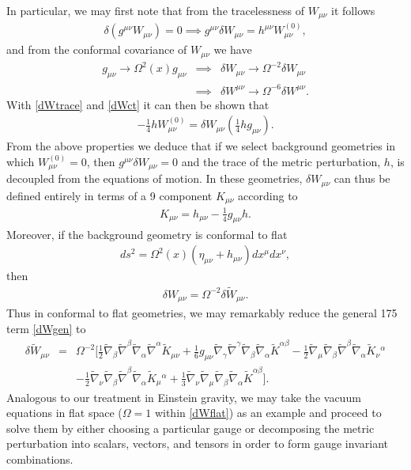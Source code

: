 \documentclass[10pt,letterpaper]{article}
\numberwithin{equation}{section}
\begin{document}
\indent In particular, we may first note that from the tracelessness of $W_{\mu\nu}$ it follows
\begin{eqnarray}
 \delta (g^{\mu\nu}W_{\mu\nu}) = 0\implies g^{\mu\nu}\delta W_{\mu\nu} = h^{\mu\nu}W^{(0)}_{\mu\nu},
 \label{dWtrace}
\end{eqnarray}
and from the conformal covariance of $W_{\mu\nu}$ we have 
\begin{eqnarray}
g_{\mu\nu} \to \Omega^2(x)g_{\mu\nu} &\implies& \delta W_{\mu\nu} \to \Omega^{-2}\delta W_{\mu\nu}
\nonumber\\
&\implies& \delta W^{\mu\nu} \to \Omega^{-6}\delta W^{\mu\nu}.
\label{dWct}
\end{eqnarray}
With \eqref{dWtrace} and \eqref{dWct} it can then be shown that
\begin{eqnarray}
-\tfrac{1}{4}h W^{(0)}_{\mu\nu} = \delta W_{\mu\nu}\left( \tfrac{1}{4} h g_{\mu\nu}\right). 
\end{eqnarray}
From the above properties we deduce that if we select background geometries in which $W^{(0)}_{\mu\nu} =0$, then $g^{\mu\nu}\delta W_{\mu\nu}=0$ and the trace of the metric perturbation, $h$, is decoupled from the equations of motion. In these geometries, $\delta W_{\mu\nu}$ can thus be defined entirely in terms of a 9 component $K_{\mu\nu}$ according to
\begin{eqnarray}
K_{\mu\nu} = h_{\mu\nu} - \tfrac{1}{4}g_{\mu\nu} h.
\end{eqnarray}
Moreover, if the background geometry is conformal to flat
\begin{eqnarray}
ds^2 = \Omega^2(x)(\eta_{\mu\nu} + h_{\mu\nu})dx^\mu dx^\nu,
\end{eqnarray}
then 
\begin{eqnarray}
\delta W_{\mu\nu} = \Omega^{-2} \delta \tilde W_{\mu\nu}.
\end{eqnarray}
Thus in conformal to flat geometries, we may remarkably reduce the general 175 term \eqref{dWgen} to 
\begin{eqnarray}
\delta \tilde W_{\mu\nu} &=& \Omega^{-2} \big[ \tfrac{1}{2}\tilde\nabla_{\beta }\tilde\nabla^{\beta }\tilde\nabla_{\alpha }\tilde\nabla^{\alpha }\tilde K_{\mu \nu } + \tfrac{1}{6} g_{\mu \nu } \tilde\nabla_{\gamma }\tilde\nabla^{\gamma }\tilde\nabla_{\beta }\tilde\nabla_{\alpha }\tilde K^{\alpha \beta } -  \tfrac{1}{2} \tilde\nabla_{\mu }\tilde\nabla_{\beta }\tilde\nabla^{\beta }\tilde\nabla_{\alpha }\tilde K_{\nu }{}^{\alpha }\nonumber\\
&& -  \tfrac{1}{2} \tilde\nabla_{\nu }\tilde\nabla_{\beta }\tilde\nabla^{\beta }\tilde\nabla_{\alpha }\tilde K_{\mu }{}^{\alpha } + \tfrac{1}{3} \tilde\nabla_{\nu }\tilde\nabla_{\mu }\tilde\nabla_{\beta }\tilde\nabla_{\alpha }\tilde K^{\alpha \beta }\big].
\label{dWflat}
\end{eqnarray}
Analogous to our treatment in Einstein gravity, we may take the vacuum equations in flat space ($\Omega=1$ within \eqref{dWflat}) as an example and proceed to solve them by either choosing a particular gauge or decomposing the metric perturbation into scalars, vectors, and tensors in order to form gauge invariant combinations. 
\end{document}

